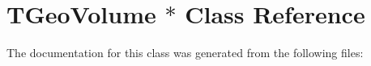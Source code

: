 \hypertarget{class_t_geo_volume_01_5}{}\section{T\+Geo\+Volume $\ast$ Class Reference}
\label{class_t_geo_volume_01_5}


The documentation for this class was generated from the following files\+: